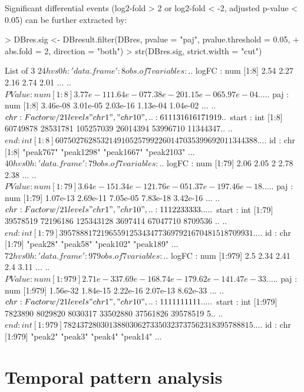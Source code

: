 \documentclass[a4paper]{article}
\begin{document}
Significant differential events (log2-fold > 2 or log2-fold < -2, adjusted p-value < 0.05) can be further extracted by:
\begin{Schunk}
\begin{Sinput}
> DBres.sig <- DBresult.filter(DBres, pvalue = "paj", pvalue.threshold = 0.05,
+                              abs.fold = 2, direction = "both")
> str(DBres.sig, strict.width =  "cut")
\end{Sinput}
\begin{Soutput}
List of 3
 $ 24hvs0h:'data.frame':	8 obs. of  7 variables:
  ..$ logFC : num [1:8] 2.54 2.27 2.16 2.74 2.01 ...
  ..$ PValue: num [1:8] 3.77e-11 1.64e-07 7.38e-20 1.15e-06 5.97e-04 ...
  ..$ paj   : num [1:8] 3.46e-08 3.01e-05 2.03e-16 1.13e-04 1.04e-02 ...
  ..$ chr   : Factor w/ 21 levels "chr1","chr10",..: 6 11 13 16 16 17 19 19
  ..$ start : int [1:8] 60749878 28531781 105257039 26014394 53996710 11344347..
  ..$ end   : int [1:8] 60750276 28532149 105257992 26014703 53996920 11344388..
  ..$ id    : chr [1:8] "peak767" "peak1298" "peak1667" "peak2103" ...
 $ 40hvs0h:'data.frame':	79 obs. of  7 variables:
  ..$ logFC : num [1:79] 2.06 2.05 2 2.78 2.38 ...
  ..$ PValue: num [1:79] 3.64e-15 1.34e-12 1.76e-05 1.37e-19 7.46e-18 ...
  ..$ paj   : num [1:79] 1.07e-13 2.69e-11 7.05e-05 7.83e-18 3.42e-16 ...
  ..$ chr   : Factor w/ 21 levels "chr1","chr10",..: 1 1 1 2 2 3 3 3 3 3 ...
  ..$ start : int [1:79] 39578519 72196186 125343128 3697414 67047710 8709536 ..
  ..$ end   : int [1:79] 39578881 72196559 125343477 3697921 67048151 8709931 ..
  ..$ id    : chr [1:79] "peak28" "peak58" "peak102" "peak189" ...
 $ 72hvs0h:'data.frame':	979 obs. of  7 variables:
  ..$ logFC : num [1:979] 2.5 2.34 2.41 2.4 3.11 ...
  ..$ PValue: num [1:979] 2.71e-33 7.69e-16 8.74e-17 9.62e-14 1.47e-33 ...
  ..$ paj   : num [1:979] 1.56e-32 1.84e-15 2.22e-16 2.07e-13 8.62e-33 ...
  ..$ chr   : Factor w/ 21 levels "chr1","chr10",..: 1 1 1 1 1 1 1 1 1 1 ...
  ..$ start : int [1:979] 7823890 8029820 8030317 33502880 37561826 39578519 5..
  ..$ end   : int [1:979] 7824372 8030138 8030627 33503237 37562318 39578881 5..
  ..$ id    : chr [1:979] "peak2" "peak3" "peak4" "peak14" ...
\end{Soutput}
\end{Schunk}
\section{Temporal pattern analysis}
\end{document}
